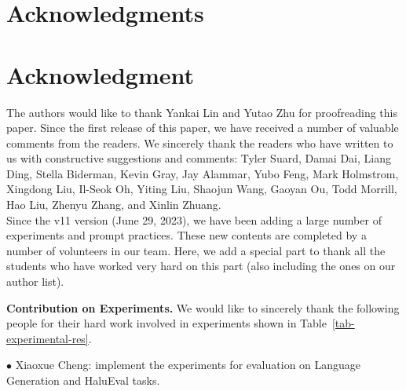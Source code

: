 \documentclass[10pt,journal,compsoc,x11names]{IEEEtran}
\newcommand{\paratitle}[1]{\vspace{1.5ex}\noindent\textbf{#1}}
\begin{document}
\maketitle


\IEEEdisplaynontitleabstractindextext


\IEEEpeerreviewmaketitle






















\ifCLASSOPTIONcompsoc
  \section*{Acknowledgments}
\else
  \section*{Acknowledgment}
\fi

The authors would like to thank Yankai Lin and Yutao Zhu for proofreading this paper. 
Since the first release of this paper, we have received a number of valuable comments from the readers. 
We sincerely thank the readers who have written to us with constructive suggestions and comments: Tyler Suard, Damai Dai, Liang Ding,  Stella Biderman,  Kevin Gray,  Jay Alammar, Yubo Feng,  Mark Holmstrom, Xingdong Liu, Il-Seok Oh, Yiting Liu,  Shaojun Wang,  Gaoyan Ou,  Todd Morrill, Hao Liu,  Zhenyu Zhang, and Xinlin Zhuang.
\\

   
Since the v11 version (June 29, 2023),  we have been adding a large number of experiments and prompt practices. These new contents are completed by a number of volunteers in our team. Here, we add a special part to thank all the students who have worked very hard on this part (also including the ones on our author list). 

\paratitle{Contribution on Experiments.} 
We would like to sincerely thank the following people for their hard work involved in experiments shown in Table~\ref{tab-experimental-res}.

$\bullet$ Xiaoxue Cheng: implement the experiments for evaluation on Language Generation and HaluEval tasks.
\end{document}
